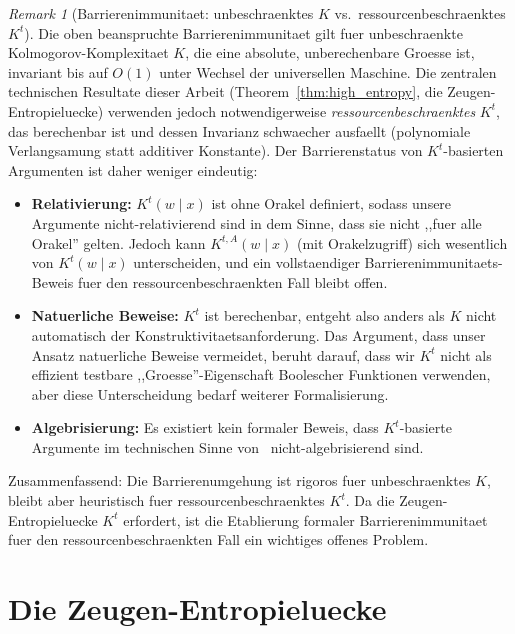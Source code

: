 \documentclass[aps,prd,twocolumn,superscriptaddress,nofootinbib]{revtex4-2}
\theoremstyle{definition}
\theoremstyle{remark}
\newtheorem{remark}[theorem]{Remark}
\begin{document}
\begin{remark}[Barrierenimmunitaet: unbeschraenktes $K$ vs.\ ressourcenbeschraenktes $K^t$]
\label{rem:barrier-K-vs-Kt}
Die oben beanspruchte Barrierenimmunitaet gilt fuer unbeschraenkte Kolmogorov-Komplexitaet $K$, die eine absolute, unberechenbare Groesse ist, invariant bis auf $O(1)$ unter Wechsel der universellen Maschine. Die zentralen technischen Resultate dieser Arbeit (Theorem~\ref{thm:high_entropy}, die Zeugen-Entropieluecke) verwenden jedoch notwendigerweise \emph{ressourcenbeschraenktes} $K^t$, das berechenbar ist und dessen Invarianz schwaecher ausfaellt (polynomiale Verlangsamung statt additiver Konstante). Der Barrierenstatus von $K^t$-basierten Argumenten ist daher weniger eindeutig:
\begin{itemize}
\item \textbf{Relativierung:} $K^t(w \mid x)$ ist ohne Orakel definiert, sodass unsere Argumente nicht-relativierend sind in dem Sinne, dass sie nicht ,,fuer alle Orakel'' gelten. Jedoch kann $K^{t,A}(w \mid x)$ (mit Orakelzugriff) sich wesentlich von $K^t(w \mid x)$ unterscheiden, und ein vollstaendiger Barrierenimmunitaets-Beweis fuer den ressourcenbeschraenkten Fall bleibt offen.
\item \textbf{Natuerliche Beweise:} $K^t$ ist berechenbar, entgeht also anders als $K$ nicht automatisch der Konstruktivitaetsanforderung. Das Argument, dass unser Ansatz natuerliche Beweise vermeidet, beruht darauf, dass wir $K^t$ nicht als effizient testbare ,,Groesse''-Eigenschaft Boolescher Funktionen verwenden, aber diese Unterscheidung bedarf weiterer Formalisierung.
\item \textbf{Algebrisierung:} Es existiert kein formaler Beweis, dass $K^t$-basierte Argumente im technischen Sinne von~\cite{AaronsonWigderson2009} nicht-algebrisierend sind.
\end{itemize}
Zusammenfassend: Die Barrierenumgehung ist rigoros fuer unbeschraenktes $K$, bleibt aber heuristisch fuer ressourcenbeschraenktes $K^t$. Da die Zeugen-Entropieluecke $K^t$ erfordert, ist die Etablierung formaler Barrierenimmunitaet fuer den ressourcenbeschraenkten Fall ein wichtiges offenes Problem.
\end{remark}


\section{Die Zeugen-Entropieluecke}
\label{sec:gap}
\end{document}
